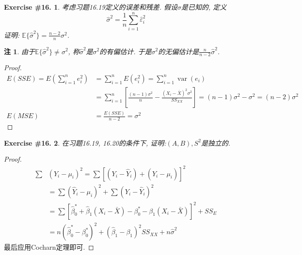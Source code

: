 \documentclass[UTF8, a4paper]{article}
\newtheorem{exercise}{Exercise \#16.}
\newtheorem*{remark}{注}
\begin{document}
\begin{framed}
\begin{exercise}
考虑习题16.19定义的误差和残差. 假设\(\sigma\)是已知的, 定义
$$
\hat{\sigma}^2=\frac{1}{n} \sum_{i=1}^n \hat{\varepsilon}_i^2
$$
证明: \(\mathbb{E}\{\hat{\sigma}^2\} = \frac{n-2}{n}\sigma^2\).
\end{exercise}
\end{framed}
\begin{remark}
由于\(\mathbb{E}\{\hat{\sigma}^2\} \neq \sigma^2\), 称\(\hat{\sigma}^2\)是\(\sigma^2\)的有偏估计.
于是\(\sigma^2\)的无偏估计是\(\frac{n}{n-2}\hat{\sigma}^2\).
\end{remark}

\begin{proof}
$$
\begin{aligned}
E(S S E)=E\left(\sum_{i=1}^n e_i^2\right)&=\sum_{i=1}^n E\left(e_i^2\right)=\sum_{i=1}^n \operatorname{var}\left(e_i\right) \\
& =\sum_{i=1}^n\left[\frac{(n-1) \sigma^2}{n}-\frac{\left(X_i-\bar{X}\right)^2 \sigma^2}{S S_{X X}}\right]=(n-1) \sigma^2-\sigma^2=(n-2) \sigma^2 \\
E(M S E)&=\frac{E(S S E)}{n-2}=\sigma^2
\end{aligned}
$$
\end{proof}

\begin{framed}
\begin{exercise}
在习题16.19, 16.20的条件下, 证明:\((A, B), S^2\)是独立的.
\end{exercise}
\end{framed}


\begin{proof}
$$
\begin{aligned}
\sum & \left(Y_i-\mu_i\right)^2=\sum\left[\left(Y_i-\hat{Y}_i\right)+\left(\hat{Y}_i-\mu_i\right)\right]^2 \\
& =\sum\left(\hat{Y}_i-\mu_i\right)^2+\sum\left(Y_i-\hat{Y}_i\right)^2 \\
& =\sum\left[\hat{\beta}_0^*+\hat{\beta}_1\left(X_i-\bar{X}\right)-\beta_0^*-\beta_1\left(X_i-\bar{X}\right)\right]^2+S S_E \\
& =n\left(\hat{\beta}_0^*-\beta_0^*\right)^2+\left(\hat{\beta}_1-\beta_1\right)^2 S S_{X X}+n \hat{\sigma}^2
\end{aligned}
$$
最后应用Cocharn定理即可.
\end{proof}
\end{document}
